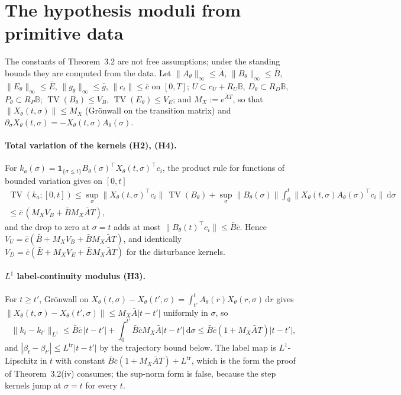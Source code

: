 \documentclass[11pt,a4paper]{article}
\theoremstyle{plain}
\theoremstyle{definition}
\theoremstyle{remark}
\newcommand{\dd}{\,\mathrm{d}}
\DeclareMathOperator{\TV}{TV}
\begin{document}
\section{The hypothesis moduli from primitive data}\label{S:moduli}

The constants of Theorem~3.2 are not free assumptions; under the standing bounds they are computed from the data. Let $\|A_\theta\|_\infty\le\bar A$, $\|B_\theta\|_\infty\le\bar B$, $\|E_\theta\|_\infty\le\bar E$, $\|g_\theta\|_\infty\le\bar g$, $\|c_i\|\le\bar c$ on $[0,T]$; $U\subset c_U+R_U\mathbb B$, $D_\theta\subset R_D\mathbb B$, $P_\theta\subset R_P\mathbb B$; $\TV(B_\theta)\le V_B$, $\TV(E_\theta)\le V_E$; and $M_X:=e^{\bar AT}$, so that $\|X_\theta(t,\sigma)\|\le M_X$ (Gr\"onwall on the transition matrix) and $\partial_\sigma X_\theta(t,\sigma)=-X_\theta(t,\sigma)A_\theta(\sigma)$.

\paragraph{Total variation of the kernels (H2), (H4).}
For $k_a(\sigma)=\mathbf 1_{\{\sigma\le t\}}B_\theta(\sigma)^\top X_\theta(t,\sigma)^\top c_i$, the product rule for functions of bounded variation gives on $[0,t]$
\begin{multline*}
\TV(k_a;[0,t])\le\sup_\sigma\|X_\theta(t,\sigma)^\top c_i\|\,\TV(B_\theta)+\sup_\sigma\|B_\theta(\sigma)\|\int_0^t\|X_\theta(t,\sigma)A_\theta(\sigma)^\top c_i\|\dd\sigma\\
\le\bar c\,(M_XV_B+\bar BM_X\bar AT),
\end{multline*}
and the drop to zero at $\sigma=t$ adds at most $\|B_\theta(t)^\top c_i\|\le\bar B\bar c$. Hence $V_U=\bar c(\bar B+M_XV_B+\bar BM_X\bar AT)$, and identically $V_D=\bar c(\bar E+M_XV_E+\bar EM_X\bar AT)$ for the disturbance kernels.

\paragraph{$L^1$ label-continuity modulus (H3).}
For $t\ge t'$, Gr\"onwall on $X_\theta(t,\sigma)-X_\theta(t',\sigma)=\int_{t'}^tA_\theta(r)X_\theta(r,\sigma)\dd r$ gives $\|X_\theta(t,\sigma)-X_\theta(t',\sigma)\|\le M_X\bar A|t-t'|$ uniformly in $\sigma$, so
\[
\|k_t-k_{t'}\|_{L^1}\le\bar B\bar c\,|t-t'|+\int_0^{t'}\bar B\bar cM_X\bar A|t-t'|\dd\sigma\le\bar B\bar c(1+M_X\bar AT)|t-t'| ,
\]
and $|\beta_t-\beta_{t'}|\le L^{\mathrm{tr}}|t-t'|$ by the trajectory bound below. The label map is $L^1$-Lipschitz in $t$ with constant $\bar B\bar c(1+M_X\bar AT)+L^{\mathrm{tr}}$, which is the form the proof of Theorem~3.2(iv) consumes; the sup-norm form is false, because the step kernels jump at $\sigma=t$ for every $t$.
\end{document}
